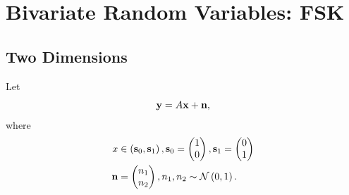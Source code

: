\documentclass[10pt, a4paper]{article}
\providecommand{\brak}[1]{\ensuremath{\left(#1\right)}}
\begin{document}
\section{Bivariate Random Variables: FSK}
\subsection{Two Dimensions}
     Let 
    \begin{equation}
    \mathbf{y} = A\mathbf{x} + \mathbf{n},
    \end{equation}
    where 
    \begin{align}
    x &\in \brak{\mbf{s}_0,\mbf{s}_1}, 
    \mbf{s}_0 = 
    \begin{pmatrix}
    1 
    \\
    0
    \end{pmatrix},
    \mbf{s}_1 = 
    \begin{pmatrix}
    0 
    \\
    1
    \end{pmatrix}
    \\
    \mbf{n} &= 
    \begin{pmatrix}
    n_1
    \\
    n_2
    \end{pmatrix},
    n_1,n_2 \sim \gauss{0}{1}.
    \end{align}
\end{document}
